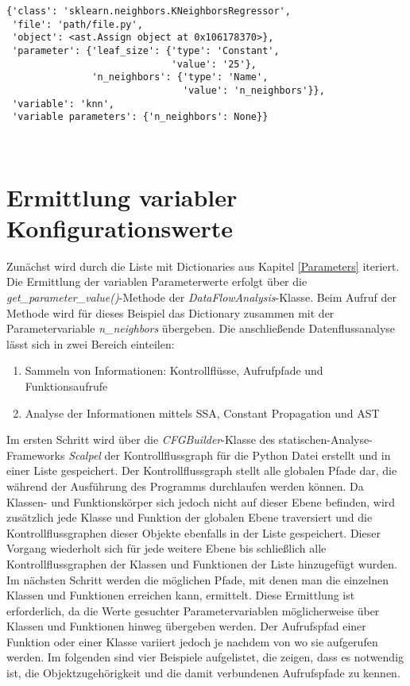 \documentclass[german,bachelor]{swsLeipzig}
\begin{document}
\noindent\begin{minipage}{\linewidth}
\begin{lstlisting}[frame=single, label=param_dict, basicstyle=\small, caption={Dictionary-Eintrag der KNeighborsRegressor-Klasse inklusive Parameter},captionpos=b]
{'class': 'sklearn.neighbors.KNeighborsRegressor',
 'file': 'path/file.py',
 'object': <ast.Assign object at 0x106178370>},
 'parameter': {'leaf_size': {'type': 'Constant',
                             'value': '25'},
               'n_neighbors': {'type': 'Name',
                               'value': 'n_neighbors'}},
 'variable': 'knn',
 'variable parameters': {'n_neighbors': None}}
\end{lstlisting}
\end{minipage}
\

\section{Ermittlung variabler Konfigurationswerte}\label{dataflow}
Zunächst wird durch die Liste mit Dictionaries aus Kapitel \ref{Parameters} iteriert.
Die Ermittlung der variablen Parameterwerte erfolgt über die \textit{get\_parameter\_value()}-Methode der \textit{DataFlowAnalysis}-Klasse.
Beim Aufruf der Methode wird für dieses Beispiel das Dictionary zusammen mit der Parametervariable \textit{n\_neighbors} übergeben.
Die anschließende Datenflussanalyse lässt sich in zwei Bereich einteilen:

\begin{enumerate}
 \item Sammeln von Informationen: Kontrollflüsse, Aufrufpfade und Funktionsaufrufe
 \item Analyse der Informationen mittels SSA, Constant Propagation und AST
\end{enumerate}

\noindent Im ersten Schritt wird über die \textit{CFGBuilder}-Klasse des statischen-Analyse-Frameworks \textit{Scalpel} der
Kontrollflussgraph für die Python Datei erstellt und in einer Liste gespeichert.
Der Kontrollflussgraph stellt alle globalen Pfade dar, die während der Ausführung des Programms durchlaufen werden können.
Da Klassen- und Funktionskörper sich jedoch nicht auf dieser Ebene befinden, wird zusätzlich jede Klasse und Funktion
der globalen Ebene traversiert und die Kontrollflussgraphen dieser Objekte ebenfalls in der Liste gespeichert.
Dieser Vorgang wiederholt sich für jede weitere Ebene bis schließlich alle Kontrollflussgraphen der
Klassen und Funktionen der Liste hinzugefügt wurden. \\
\indent Im nächsten Schritt werden die möglichen Pfade, mit denen man die einzelnen Klassen und Funktionen erreichen kann, ermittelt.
Diese Ermittlung ist erforderlich, da die Werte gesuchter Parametervariablen möglicherweise über Klassen und Funktionen hinweg
übergeben werden.
Der Aufrufspfad einer Funktion oder einer Klasse variiert jedoch je nachdem von wo sie aufgerufen werden.
Im folgenden sind vier Beispiele aufgelistet, die zeigen, dass es notwendig ist, die Objektzugehörigkeit und die damit
verbundenen Aufrufspfade zu kennen.
\end{document}
